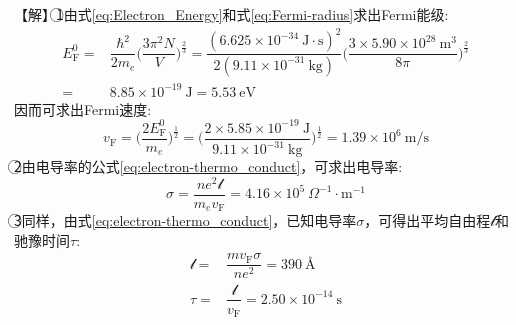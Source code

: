 【解】\textcircled{1}由式\eqref{eq:Electron_Energy}和式\eqref{eq:Fermi-radius}求出Fermi能级:
\begin{displaymath}
	\begin{aligned}
		E_{\mathrm{F}}^0=&\dfrac{\hbar^2}{2m_e}\bigg(\dfrac{3\pi^2N}V\bigg)^{\frac23}=\dfrac{(6.625\times10^{-34}~\mathrm{J\cdot s})^2}{2(9.11\times10^{-31}~\mathrm{kg})}\bigg(\dfrac{3\times5.90\times10^{28}~\mathrm{m}^3}{8\pi}\bigg)^{\frac23}\\
		=&8.85\times10^{-19}~\mathrm{J}=5.53~\mathrm{eV}
	\end{aligned}
\end{displaymath} 
因而可求出Fermi速度:
\begin{displaymath}
	v_{\mathrm{F}}=\bigg(\dfrac{2E_{\mathrm{F}}^0}{m_e}\bigg)^{\frac12}=\bigg(\dfrac{2\times5.85\times10^{-19}~\mathrm{J}}{9.11\times10^{-31}~\mathrm{kg}}\bigg)^{\frac12}=1.39\times10^6~\mathrm{m/s}
\end{displaymath} 
\textcircled{2}由电导率的公式\eqref{eq:electron-thermo_conduct}，可求出电导率:
\begin{displaymath}
	\sigma=\dfrac{ne^2\mathscr{l}}{m_ev_{\mathrm{F}}}=4.16\times10^5~\Omega^{-1}\cdot\mathrm{m}^{-1}
\end{displaymath} 
\textcircled{3}同样，由式\eqref{eq:electron-thermo_conduct}，已知电导率$\sigma$，可得出平均自由程$\mathscr{l}$和驰豫时间$\tau$:
\begin{displaymath}
	\begin{aligned}
		\mathscr{l}=&\dfrac{mv_{\mathrm{F}}\sigma}{ne^2}=390~\mbox{\AA}\\
		\tau=&\dfrac{\mathscr{l}}{v_{\mathrm{F}}}=2.50\times10^{-14}~\mathrm{s} 
	\end{aligned}
\end{displaymath}

